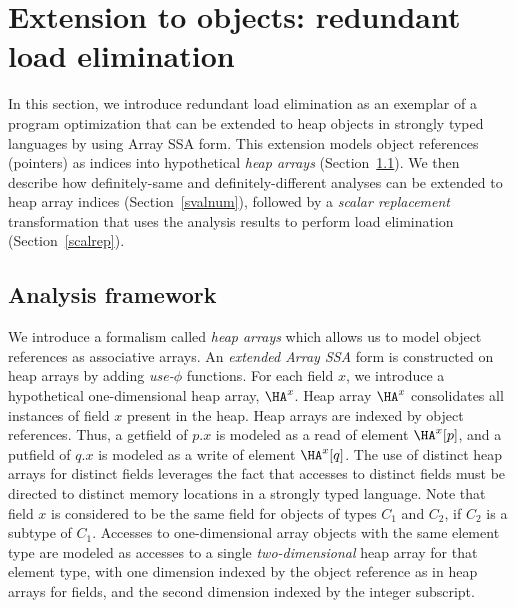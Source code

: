\section{Extension to objects: redundant load elimination}
\label{sec:heap}
In this section, we
introduce redundant load elimination as an exemplar of a program
optimization that can be extended to heap objects  in strongly typed
languages by using Array SSA form.
This extension models object references (pointers) as
indices into hypothetical {\em heap arrays} (Section~\ref{model}).
We then describe how definitely-same and definitely-different analyses
can be extended to heap array indices (Section~\ref {svalnum}),
followed by a {\em scalar replacement} transformation
that uses the analysis results to perform load elimination (Section~\ref{scalrep}).

\subsection{Analysis framework}\label{model}
We introduce a
formalism called {\em heap arrays} which allows us to model
object references as associative arrays.   
An {\em extended Array SSA} form is constructed on heap arrays by
adding
{\em use-$\phi$} functions.
For each field $x$, we introduce
a hypothetical one-dimensional
heap array,  $\HA^x$.
Heap array $\HA^x$ consolidates all instances of field
$x$ present in the heap.
Heap arrays are indexed by object references.
Thus, a {\sc getfield}
of $p.x$ is modeled as a read of element $\HA^x[p]$,
and a {\sc putfield} of $q.x$ is modeled as a write of element $\HA^x[q]$.
The use of distinct heap arrays for distinct fields leverages the 
fact that accesses to distinct fields must be directed to 
distinct memory locations in a strongly typed language.
Note that field $x$ is considered to be the same field for objects of types
$C_1$ and $C_2$, if $C_2$ is
a subtype of $C_1$.
Accesses to one-dimensional array objects with the same element type
are modeled as accesses to a single {\it two-dimensional} heap
array for that element type, with one dimension indexed by
the object reference as in heap arrays for fields, and the second
dimension indexed by the integer subscript. 

